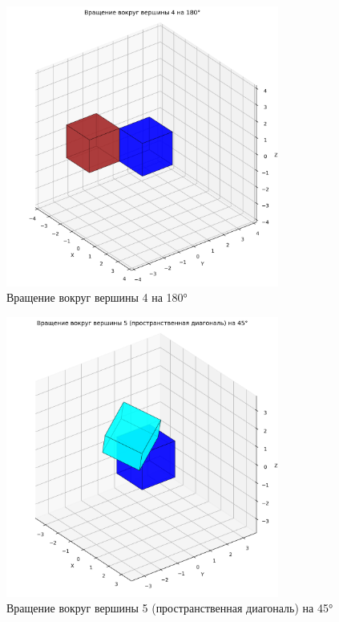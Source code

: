 \begin{figure}[H]
\centering
\includegraphics[width=0.8\textwidth]{images/task5/rotate_around_vertex_4.png}
\caption{Вращение вокруг вершины 4 на 180°}
\end{figure}

\begin{figure}[H]
\centering
\includegraphics[width=0.8\textwidth]{images/task5/rotate_around_vertex_5.png}
\caption{Вращение вокруг вершины 5 (пространственная диагональ) на 45°}
\end{figure}

